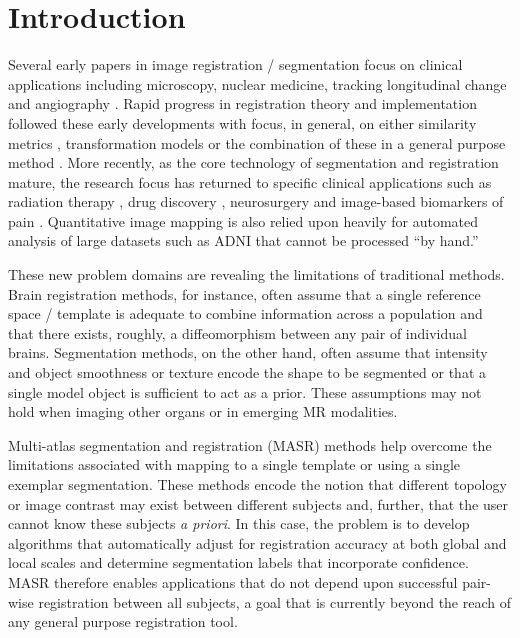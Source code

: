 \documentclass{llncs}
\begin{document}
\section{Introduction}
Several early papers in image registration / segmentation focus on 
clinical applications including microscopy, nuclear medicine, tracking longitudinal
change and angiography
\cite{Badran1991,Venot1986,Venot1984,Wrigley1982,Adair1981}.  Rapid progress in registration
theory and implementation followed these early developments with
focus, in general, on either similarity metrics \cite{Wells1996},
transformation models \cite{Miller2005} or the combination of these in a general
purpose method \cite{Rueckert1999}.  More recently, as the core technology of segmentation and
registration mature, the research focus has returned to specific clinical
applications such as radiation therapy \cite{Chan2013}, drug discovery \cite{Fox2009},
neurosurgery \cite{Omara2013} and image-based biomarkers of pain \cite{Loggia2013}.  
Quantitative image mapping is also relied upon heavily for automated analysis of large datasets
such as ADNI \cite{Weiner2012} that cannot be processed ``by hand.''

These new problem domains are revealing the limitations of traditional
methods.  Brain registration methods, for instance, often assume that
a single reference space / template is adequate to combine information
across a population and that there exists, roughly, a diffeomorphism
between any pair of individual brains.  Segmentation methods, on the
other hand, often assume that intensity and object smoothness or
texture encode the shape to be segmented or that a single model object
is sufficient to act as a prior.  These assumptions may not
hold when imaging other organs or in emerging MR modalities.  

Multi-atlas segmentation and registration (MASR) methods help overcome
the limitations associated with mapping to a single template or using
a single exemplar segmentation.  These methods encode the notion that
different topology or image contrast may exist between different
subjects and, further, that the user cannot know these subjects {\em a
priori}.  In this case, the problem is to develop algorithms that
automatically adjust for registration accuracy at both global and
local scales and determine segmentation labels that incorporate
confidence.  MASR therefore enables applications that do not depend upon
successful pair-wise registration between all subjects, a goal that is
currently beyond the reach of any general purpose registration tool.
\end{document}
